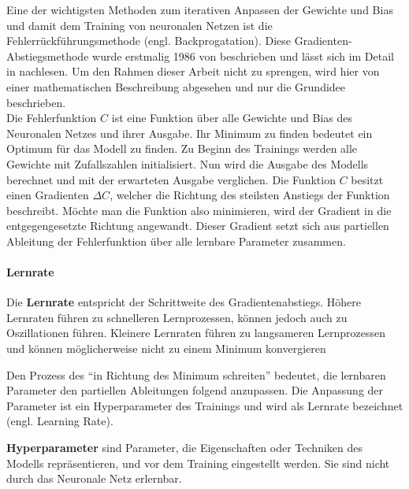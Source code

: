 Eine der wichtigsten Methoden zum iterativen Anpassen der Gewichte und Bias und damit dem Training von neuronalen Netzen ist die Fehlerrückführungsmethode (engl. Backprogatation).
Diese Gradienten-Abstiegsmethode wurde erstmalig 1986 von \citet{backpropagation} beschrieben und lässt sich im Detail in \citet{neuronale-netze} nachlesen.
Um den Rahmen dieser Arbeit nicht zu sprengen, wird hier von einer mathematischen Beschreibung abgesehen und nur die Grundidee beschrieben.\\

Die Fehlerfunktion $C$ ist eine Funktion über alle Gewichte und Bias des Neuronalen Netzes und ihrer Ausgabe.
Ihr Minimum zu finden bedeutet ein Optimum für das Modell zu finden.
Zu Beginn des Trainings werden alle Gewichte mit Zufallszahlen initialisiert.
Nun wird die Ausgabe des Modells berechnet und mit der erwarteten Ausgabe verglichen.
Die Funktion $C$ besitzt einen Gradienten $\Delta C$, welcher die Richtung des steilsten Anstiegs der Funktion beschreibt.
Möchte man die Funktion also minimieren, wird der Gradient in die entgegengesetzte Richtung angewandt.
Dieser Gradient setzt sich aus partiellen Ableitung der Fehlerfunktion über alle lernbare Parameter zusammen.\\

\paragraph{Lernrate}
\begin{definition}\label{def:lernrate}
    Die \textbf{Lernrate} entspricht der Schrittweite des Gradientenabstiegs. Höhere Lernraten führen zu schnelleren Lernprozessen, können jedoch auch zu Oszillationen führen.
    Kleinere Lernraten führen zu langsameren Lernprozessen und können möglicherweise nicht zu einem Minimum konvergieren
\end{definition}
Den Prozess des \enquote{in Richtung des Minimum schreiten} bedeutet, die lernbaren Parameter den partiellen Ableitungen folgend anzupassen.
Die Anpassung der Parameter ist ein Hyperparameter des Trainings und wird als Lernrate bezeichnet (engl. Learning Rate).\\

\begin{definition}\label{def:hyperparameter}
    \textbf{Hyperparameter} sind Parameter, die Eigenschaften oder Techniken des Modells repräsentieren, und vor dem Training eingestellt werden.
    Sie sind nicht durch das Neuronale Netz erlernbar.
\end{definition}

